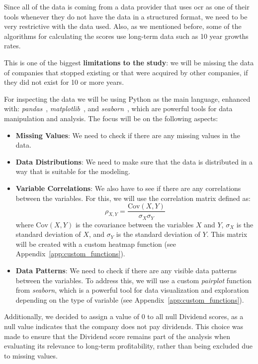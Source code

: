 \documentclass[11pt,english,a4paper,hidelinks]{book}
\begin{document}
Since all of the data is coming from a data provider that uses \acrshort{ocr} as one of their tools whenever they do not have the data in a structured format, we need to be very restrictive with the data used. Also, as we mentioned before, some of the algorithms for calculating the scores use long-term data such as 10 year growths rates.

\vspace{0.5cm}
\noindent This is one of the biggest \textbf{limitations to the study}: we will be missing the data of companies that stopped existing or that were acquired by other companies, if they did not exist for 10 or more years.

\vspace{0.5cm}
\noindent For inspecting the data we will be using Python as the main language, enhanced with: \textit{pandas}~\cite{pandas2024}, \textit{matplotlib}~\cite{matplotlib2025doc}, and \textit{seaborn}~\cite{seaborn2024}, which are powerful tools for data manipulation and analysis. The focus will be on the following aspects:
\begin{itemize}
  \item \textbf{Missing Values}: We need to check if there are any missing values in the data.
  \item \textbf{Data Distributions}: We need to make sure that the data is distributed in a way that is suitable for the modeling.
  \item \textbf{Variable Correlations}: We also have to see if there are any correlations between the variables. For this, we will use the correlation matrix defined as:
  \begin{equation}
    \rho_{X,Y} = \frac{\text{Cov}(X,Y)}{\sigma_X \sigma_Y}
  \end{equation}
  where \(\text{Cov}(X,Y)\) is the covariance between the variables \(X\) and \(Y\), \(\sigma_X\) is the standard deviation of \(X\), and \(\sigma_Y\) is the standard deviation of \(Y\). This matrix will be created with a custom heatmap function (see Appendix~\ref{app:custom_functions}).
  \item \textbf{Data Patterns}: We need to check if there are any visible data patterns between the variables. To address this, we will use a custom \textit{\acrshort{pairplot}} function from \textit{seaborn}, which is a powerful tool for data visualization and exploration  depending on the type of variable (see Appendix~\ref{app:custom_functions}).
\end{itemize}

\vspace{0.5cm}
\noindent Additionally, we decided to assign a value of 0 to all null Dividend scores, as a null value indicates that the company does not pay dividends. This choice was made to ensure that the Dividend score remains part of the analysis when evaluating its relevance to long-term profitability, rather than being excluded due to missing values.
\end{document}
